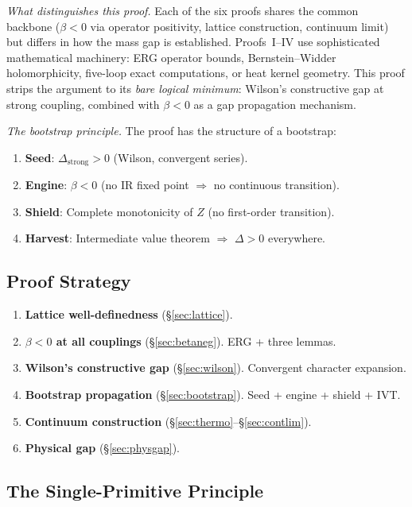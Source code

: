 \documentclass[12pt,a4paper]{article}
\theoremstyle{plain}
\theoremstyle{definition}
\theoremstyle{remark}
\begin{document}
\textit{What distinguishes this proof.} Each of the six proofs shares the common backbone ($\beta<0$ via operator positivity, lattice construction, continuum limit) but differs in how the mass gap is established. Proofs~I--IV use sophisticated mathematical machinery: ERG operator bounds, Bernstein--Widder holomorphicity, five-loop exact computations, or heat kernel geometry. This proof strips the argument to its \emph{bare logical minimum}: Wilson's constructive gap at strong coupling, combined with $\beta<0$ as a gap propagation mechanism.

\textit{The bootstrap principle.} The proof has the structure of a bootstrap:
\begin{enumerate}[nosep]
\item \textbf{Seed}: $\Delta_{\mathrm{strong}}>0$ (Wilson, convergent series).
\item \textbf{Engine}: $\beta<0$ (no IR fixed point $\Rightarrow$ no continuous transition).
\item \textbf{Shield}: Complete monotonicity of $Z$ (no first-order transition).
\item \textbf{Harvest}: Intermediate value theorem $\Rightarrow$ $\Delta>0$ everywhere.
\end{enumerate}

\subsection{Proof Strategy}\label{sec:strategy}

\begin{enumerate}[label=\textbf{S\arabic*},leftmargin=3em]
\item \textbf{Lattice well-definedness} (\S\ref{sec:lattice}).
\item \textbf{$\beta<0$ at all couplings} (\S\ref{sec:betaneg}). ERG + three lemmas.
\item \textbf{Wilson's constructive gap} (\S\ref{sec:wilson}). Convergent character expansion.
\item \textbf{Bootstrap propagation} (\S\ref{sec:bootstrap}). Seed + engine + shield + IVT.
\item \textbf{Continuum construction} (\S\ref{sec:thermo}--\S\ref{sec:contlim}).
\item \textbf{Physical gap} (\S\ref{sec:physgap}).
\end{enumerate}

\subsection{The Single-Primitive Principle}\label{sec:primitive}
\end{document}
